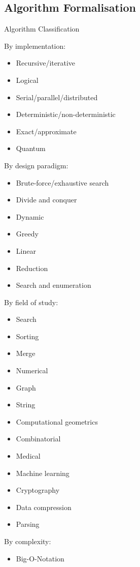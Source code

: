 \subsection{Algorithm Formalisation}

Algorithm Classification

By implementation:
\begin{itemize}
  \item Recursive/iterative
  \item Logical
  \item Serial/parallel/distributed
  \item Deterministic/non-deterministic
  \item Exact/approximate
  \item Quantum
\end{itemize}

By design paradigm:
\begin{itemize}
  \item Brute-force/exhaustive search
  \item Divide and conquer
  \item Dynamic
  \item Greedy
  \item Linear
  \item Reduction
  \item Search and enumeration
\end{itemize}

By field of study:
\begin{itemize}
  \item Search
  \item Sorting
  \item Merge
  \item Numerical
  \item Graph
  \item String
  \item Computational geometrics
  \item Combinatorial
  \item Medical
  \item Machine learning
  \item Cryptography
  \item Data compression
  \item Parsing
\end{itemize}

By complexity:
\begin{itemize}
  \item Big-O-Notation
\end{itemize}

